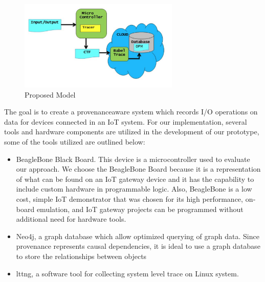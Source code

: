\begin{figure}[h]
\begin{center}

\includegraphics[width =3.0in]{architecture.PNG}    
\end{center}
\caption{Proposed Model}
\label{architecture}
\end{figure}

The goal is to create a provenance\-aware system which records I/O operations on data for devices connected in an IoT system. For our implementation, several tools and hardware components are utilized in the development of our prototype, some of the tools utilized are outlined below:

\begin{itemize}
\item BeagleBone Black Board. This device is a microcontroller used to evaluate our approach. We choose the BeagleBone Board because it is a representation of what can be found on an IoT gateway device and it has the capability to include custom hardware in programmable logic. Also, BeagleBone is a low cost, simple IoT demonstrator that was chosen for its high performance, on­board emulation, and IoT gateway projects can be programmed without additional need for hardware tools.


\item Neo4j, a graph database which allow optimized querying of graph data. Since provenance represents causal dependencies, it is ideal to use a graph database to store the relationships between objects

\item lttng, a software tool for collecting system level trace on Linux system. 

\end{itemize}


